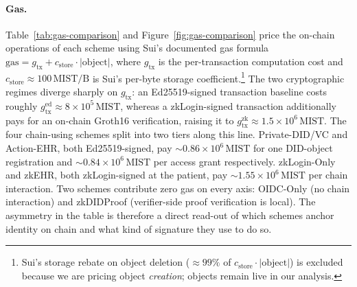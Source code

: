 \paragraph{Gas.}
Table~\ref{tab:gas-comparison} and Figure~\ref{fig:gas-comparison} price
the on-chain operations of each scheme using Sui's documented gas
formula
$\text{gas} = g_{\text{tx}} + c_{\text{store}}\!\cdot\!|\text{object}|$,
where $g_{\text{tx}}$ is the per-transaction computation cost and
$c_{\text{store}}\!\approx\!100\,\mathrm{MIST}/\mathrm{B}$ is Sui's
per-byte storage coefficient.\footnote{Sui's storage rebate on object
deletion (${\approx}99\%$ of $c_{\text{store}}\!\cdot\!|\text{object}|$)
is excluded because we are pricing object \emph{creation}; objects
remain live in our analysis.} The two cryptographic regimes diverge
sharply on $g_{\text{tx}}$: an Ed25519-signed transaction baseline costs
roughly $g_{\text{tx}}^{\text{ed}}\!\approx\!8\!\times\!10^{5}\,\mathrm{MIST}$,
whereas a zkLogin-signed transaction additionally pays for an on-chain
Groth16 verification, raising it to
$g_{\text{tx}}^{\text{zk}}\!\approx\!1.5\!\times\!10^{6}\,\mathrm{MIST}$.
The four chain-using schemes split into two tiers along this line.
\textsf{Private-DID/VC} and \textsf{Action-EHR}, both Ed25519-signed,
pay $\sim\!0.86\!\times\!10^{6}\,\mathrm{MIST}$ for one DID-object
registration and $\sim\!0.84\!\times\!10^{6}\,\mathrm{MIST}$ per access
grant respectively. \textsf{zkLogin-Only} and \textsf{zkEHR}, both
zkLogin-signed at the patient, pay
$\sim\!1.55\!\times\!10^{6}\,\mathrm{MIST}$ per chain interaction. Two
schemes contribute zero gas on every axis: \textsf{OIDC-Only} (no chain
interaction) and \textsf{zkDIDProof} (verifier-side proof verification
is local). The asymmetry in the table is therefore a direct read-out
of which schemes anchor identity on chain and what kind of signature
they use to do so.

